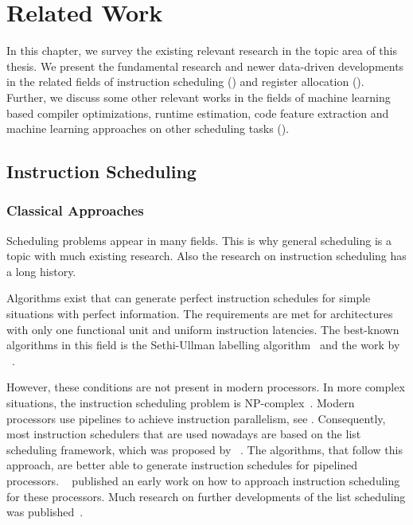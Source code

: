 \chapter{Related Work}
\label{sec:rw}
In this chapter, we survey the existing relevant research in the topic area of this thesis. 
We present the fundamental research and newer data-driven developments in the related fields of instruction scheduling () and register allocation ().
Further, we discuss some other relevant works in the fields of machine learning based compiler optimizations, runtime estimation, code feature extraction and machine learning approaches on other scheduling tasks ().

\section{Instruction Scheduling}
\label{sec:rw:instruction-scheduling}
\subsection{Classical Approaches}
Scheduling problems appear in many fields.
This is why general scheduling is a topic with much existing research.
Also the research on instruction scheduling has a long history.

Algorithms exist that can generate perfect instruction schedules for simple situations with perfect information.
The requirements are met for architectures with only one functional unit and uniform instruction latencies.
The best-known algorithms in this field is the Sethi-Ullman labelling algorithm~\cite{sethi1970generation} and the work by \citeauthor{proebsting1991linear}~\cite{proebsting1991linear}.

However, these conditions are not present in modern processors.
In more complex situations, the instruction scheduling problem is NP-complex~\cite{hennessy1983postpass}.
Modern processors use pipelines to achieve instruction parallelism, see .
Consequently, most instruction schedulers that are used nowadays are based on the list scheduling framework, which was proposed by \citeauthor{landskov1980local}~\cite{landskov1980local}.
The algorithms, that follow this approach, are better able to generate instruction schedules for pipelined processors.
\citeauthor{heller1961sequencing}~\cite{heller1961sequencing} published an early work on how to approach instruction scheduling for these processors.
Much research on further developments of the list scheduling was published~\cite{bernstein1991global,gibbons1986efficient,hennessy1983postpass}.

